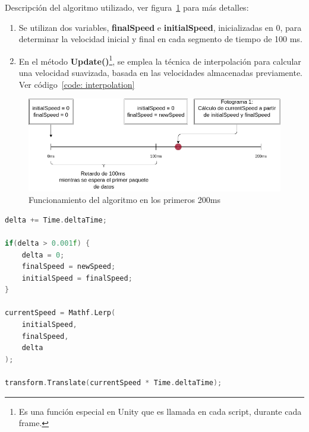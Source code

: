 Descripción del algoritmo utilizado, ver figura~\ref{fig: interpolation-algorithm} para más detalles:
\begin{enumerate}
    \item Se utilizan dos variables, \textbf{finalSpeed} e \textbf{initialSpeed}, inicializadas en 0, para determinar la velocidad inicial y final en cada segmento de tiempo de 100 ms.
    \item En el método \textbf{Update()}\footnote{Es una función especial en Unity que es llamada en cada script, durante cada frame.}, se emplea la técnica de interpolación para calcular una velocidad suavizada, basada en las velocidades almacenadas previamente. Ver código~\ref{code: interpolation}
\end{enumerate} 

\begin{figure}[ht]
    \centering
    \includegraphics[scale=0.4]{images/interpolation-algorithm.png}
    \caption{Funcionamiento del algoritmo en los primeros 200ms}
    \label{fig: interpolation-algorithm}
\end{figure}

\begin{center}
\begin{minipage}{0.8\textwidth}
\begin{lstlisting}[language=c, label={code: interpolation}, caption={Controlador de movimiento}]
delta += Time.deltaTime;
 
if(delta > 0.001f) {
    delta = 0;
    finalSpeed = newSpeed;
    initialSpeed = finalSpeed;
}

currentSpeed = Mathf.Lerp( 
    initialSpeed, 
    finalSpeed, 
    delta
);

transform.Translate(currentSpeed * Time.deltaTime);
\end{lstlisting}
\end{minipage}
\end{center}


